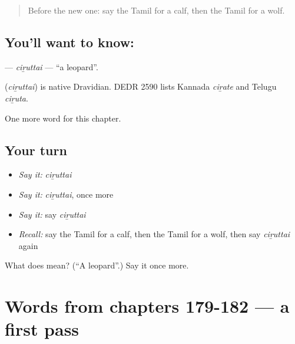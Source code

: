 \label{lesson:TA-C187-ciruttai}



\begin{quote}
Before the new one: say the Tamil for a calf, then the Tamil for a wolf.
\end{quote}

\subsection*{You'll want to know: }
\textbf{} — \emph{ciṟuttai} — \textquotedblleft{}a leopard\textquotedblright{}.

\begin{cousinweb}
\textbf{} (\emph{ciṟuttai}) is native Dravidian. DEDR 2590 lists Kannada \emph{ciṟate} and Telugu \emph{ciṟuta}.
\end{cousinweb}

\begin{grammarlens}[title={What you've built}]
One more word for this chapter.
\end{grammarlens}

\subsection*{Your turn}
\begin{itemize}
\raggedright
  \item \emph{Say it:} \emph{ciṟuttai}
  \item \emph{Say it:} \emph{ciṟuttai}, once more
  \item \emph{Say it:} say \emph{ciṟuttai}
  \item \emph{Recall:} say the Tamil for a calf, then the Tamil for a wolf, then say \emph{ciṟuttai} again
\end{itemize}

\begin{tcolorbox}[breakable,colback=teal!4,colframe=teal!35!black,title={Before you move on}]
What does  mean? (\textquotedblleft{}A leopard\textquotedblright{}.) Say it once more.
\end{tcolorbox}
\section[(dialogue)]{Words from chapters 179-182 — a first pass}

\label{lesson:TA-R187-first-pass-words-from-chapters-179-182}




